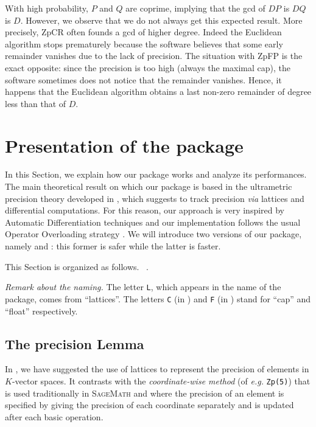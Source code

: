 \documentclass[sigconf]{acmart}
\newcommand{\sage}{\textsc{SageMath}\xspace}
\newcommand{\ZpL}{\text{\rm \tt ZpL}\xspace}
\newcommand{\ZpLC}{\text{\rm \tt ZpLC}\xspace}
\newcommand{\ZpLF}{\text{\rm \tt ZpLF}\xspace}
\def\todo#1{\ \!\!{\color{red} #1}}
\theoremstyle{definition}
\begin{document}
With high probability, $P$ and $Q$ are coprime, implying that the gcd of $DP$ is $DQ$ is $D$.  
However, we observe that we do not always get this expected result.
More precisely, ZpCR often founds a gcd of higher degree.
Indeed the Euclidean algorithm stops prematurely because the software believes that some early remainder vanishes due to the lack of precision.  
The situation with ZpFP is the exact opposite:
since the precision is too high (always the maximal cap), 
the software sometimes does not notice that the remainder vanishes.
Hence, it happens that the Euclidean algorithm 
obtains a last non-zero remainder of degree less than that of
$D.$


\section{Presentation of the package}

In this Section, we explain how our package \ZpL works and analyze
its performances.
The main theoretical result on which our package is based in the 
ultrametric precision theory developed in \cite{padicprec}, which 
suggests to track precision \emph{via} lattices and differential 
computations. For this reason, our approach is very inspired by 
Automatic Differentiation techniques \cite{} and our implementation 
follows the usual Operator Overloading strategy \cite{}.
We will introduce two versions of our package, namely \ZpLC and \ZpLF: 
this former is safer while the latter is faster.

This Section is organized as follows.
\todo{[...]}.

\smallskip

\noindent \textit{Remark about the naming.}
%
The letter \texttt{L}, which appears in the name of the package, 
comes from ``lattices''. The letters \texttt{C} (in \ZpLC) and 
\texttt{F} (in \ZpLF) stand for ``cap'' and ``float'' respectively.

\subsection{The precision Lemma}
\label{ssec:preclemma}

In \cite{caruso-roe-vaccon:14a}, we have suggested the 
use of lattices to represent the precision of elements in 
$K$-vector spaces.  It contrasts with the
\emph{coordinate-wise method} (of \textit{e.g.}
 \verb?Zp(5)?) that is used traditionally in \sage and
where the precision of an element is specified by giving the precision
of each coordinate separately and is updated after each basic
operation.
\end{document}
